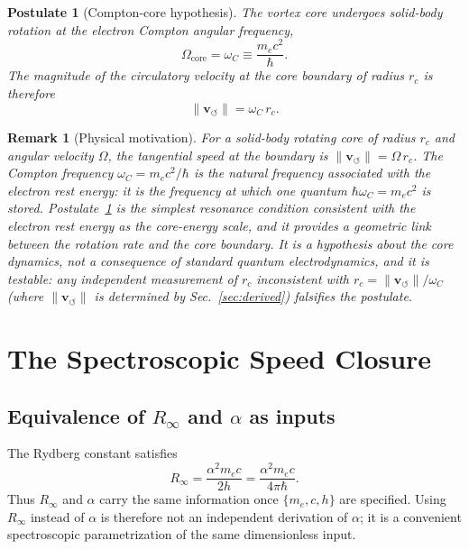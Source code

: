 \documentclass[aps,pra,preprint,longbibliography,nofootinbib]{revtex4-2}
\newtheorem{postulate}{Postulate}
\newtheorem{remark}{Remark}
\newcommand{\vnorm}{\lVert\mathbf{v}_{\!\boldsymbol{\circlearrowleft}}\rVert} %
\newcommand{\rc}{r_c}                            %
\newcommand{\omC}{\omega_C}                      %
\begin{document}
\begin{postulate}[Compton-core hypothesis]
\label{post:compton}
The vortex core undergoes solid-body rotation at the electron
Compton angular frequency,
\begin{equation}
  \Omega_{\mathrm{core}} = \omC \equiv \frac{m_e c^2}{\hbar}.
  \label{eq:postulate}
\end{equation}
The magnitude of the circulatory velocity at the core boundary
of radius $\rc$ is therefore
\begin{equation}
  \vnorm = \omC\,\rc.
  \label{eq:vc_rc_link}
\end{equation}
\end{postulate}

\begin{remark}[Physical motivation]
\label{rem:motivation}
For a solid-body rotating core of radius $\rc$ and angular
velocity $\Omega$, the tangential speed at the boundary is
$\vnorm = \Omega\,\rc$.
The Compton frequency $\omC = m_e c^2/\hbar$ is the natural
frequency associated with the electron rest energy: it is the
frequency at which one quantum $\hbar\omC = m_e c^2$ is stored.
Postulate~\ref{post:compton} is the simplest resonance condition
consistent with the electron rest energy as the core-energy scale,
and it provides a geometric link between the rotation rate and the
core boundary.
It is a hypothesis about the core dynamics, not a consequence of
standard quantum electrodynamics, and it is testable: any
independent measurement of $\rc$ inconsistent with
$\rc = \vnorm/\omC$ (where $\vnorm$ is determined by
Sec.~\ref{sec:derived}) falsifies the postulate.
\end{remark}

\section{The Spectroscopic Speed Closure}
\label{sec:rydberg}

\subsection{Equivalence of $R_\infty$ and $\alpha$ as inputs}

The Rydberg constant satisfies
\begin{equation}
  R_\infty = \frac{\alpha^2 m_e c}{2h}
           = \frac{\alpha^2 m_e c}{4\pi\hbar}.
  \label{eq:Rydberg_standard}
\end{equation}
Thus $R_\infty$ and $\alpha$ carry the same information once
$\{m_e,c,h\}$ are specified.  Using $R_\infty$ instead of $\alpha$ is
therefore not an independent derivation of $\alpha$; it is a convenient
spectroscopic parametrization of the same dimensionless input.
\end{document}
